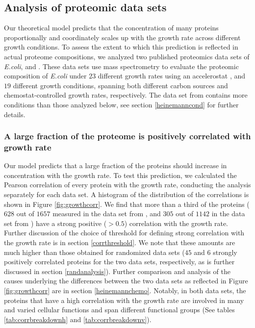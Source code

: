 \documentclass[a4paper]{article}
\newcommand{\hConds}{$19$}
\newcommand{\vnConds}{$23$}
\newcommand{\vConds}{\vnConds{}}
\newcommand{\hTotal}{$1657$}
\newcommand{\hGlobal}{$628$}
\newcommand{\hGlobalShuff}{$45$}
\newcommand{\vnTotal}{$1142$}
\newcommand{\vTotal}{\vnTotal{}}
\newcommand{\vnGlobalShuff}{$6$}
\newcommand{\vGlobalShuff}{\vnGlobalShuff{}}
\newcommand{\vnGlobal}{$305$}
\newcommand{\vGlobal}{\vnGlobal{}}
\begin{document}
\subsection{Analysis of proteomic data sets}
Our theoretical model predicts that the concentration of many proteins proportionally and coordinately scales up with the growth rate across different growth conditions.
To assess the extent to which this prediction is reflected in actual proteome compositions, we analyzed two published proteomics data sets of \emph{E.coli}, \cite{Peebo_2015} and \cite{Heinemann2015}.
These data sets use mass spectrometry to evaluate the proteomic composition of \emph{E.coli} under \vConds{} different growth rates using an accelerostat \cite{Paalme_1995}, and \hConds{} different growth conditions, spanning both different carbon sources and chemostat-controlled growth rates, respectively.
The data set from \cite{Heinemann2015} contains more conditions than those analyzed below, see section \ref{heinemanncond} for further details.

\subsubsection{A large fraction of the proteome is positively correlated with growth rate}
Our model predicts that a large fraction of the proteins should increase in concentration with the growth rate.
To test this prediction, we calculated the Pearson correlation of every protein with the growth rate, conducting the analysis separately for each data set.
A histogram of the distribution of the correlations is shown in Figure \ref{fig:growthcorr}.
We find that more than a third of the proteins (\hGlobal{} out of \hTotal{} measured in the data set from \cite{Heinemann2015}, and \vGlobal{} out of \vTotal{} in the data set from \cite{Peebo_2015}) have a strong positive ($>0.5$) correlation with the growth rate.
Further discussion of the choice of threshold for defining strong correlation with the growth rate is in section \ref{corrthreshold}.
We note that these amounts are much higher than those obtained for randomized data sets (\hGlobalShuff{} and \vGlobalShuff{} strongly positively correlated proteins for the two data sets, respectively, as is further discussed in section \ref{randanalysis}).
Further comparison and analysis of the causes underlying the differences between the two data sets as reflected in Figure \ref{fig:growthcorr} are in section \ref{heinemannchemo}.
Notably, in both data sets, the proteins that have a high correlation with the growth rate are involved in many and varied cellular functions and span different functional groups (See tables \ref{tab:corrbreakdownh} and \ref{tab:corrbreakdownv}).
\end{document}
